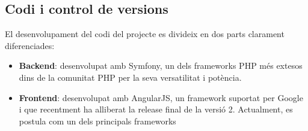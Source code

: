 \subsection{Codi i control de versions}
El desenvolupament del codi del projecte es divideix en dos parts clarament diferenciades:
\begin{itemize}
	\item \textbf{Backend}: desenvolupat amb Symfony, un dels frameworks PHP més extesos dins de la comunitat PHP per la seva versatilitat i potència.
	\item \textbf{Frontend}: desenvolupat amb AngularJS, un framework suportat per Google i  que recentment ha alliberat la release final de la versió 2. Actualment, es postula com un dels principals frameworks 
\end{itemize}

